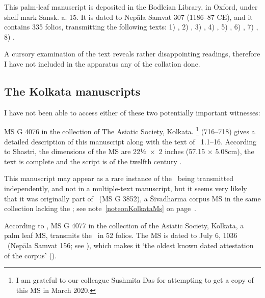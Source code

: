 This palm-leaf manuscript is deposited in the Bodleian Library, in Oxford, 
under shelf mark %
Sansk. a. 15. It is dated to Nepāla Samvat 307 (1186--87 CE),
and it contains 335 folios, transmitting the following texts: 
1) , %
2) , %
3) , %
4) , %
5) , %
6) , %
7) , %
8) . %

A cursory examination of the text reveals rather disappointing 
readings, therefore I have not included  in the apparatus
any of the collation done.

\medskip
\subsection{The Kolkata manuscripts}

I have not been able to access either of these two
potentially important witnesses:

MS G 4076 in the collection of The Asiatic Society, Kolkata.%
	\footnote{I am grateful to our colleague 
				     Sushmita Das for attempting to 
					get a copy of this MS in March 2020.}
 (716--718) gives a 
detailed description of this manuscript along with the text
of \VSS\ 1.1--16. According to Shastri, the dimensions of the MS are
22½~×~2 inches (57.15 × 5.08cm), the text is complete and
the script is of the twelfth century \CE. 

This manuscript may appear as a rare instance of the \VSS\
being transmitted independently, and not in a multiple-text
manuscript, but it seems very likely that it was originally part of
\msKob\ (MS G 3852), a Śivadharma corpus MS  in the same collection lacking the \VSS; see note~\ref{noteonKolkataMs}
on page~\pageref{noteonKolkataMs}.



According to ,
MS G 4077 in the collection of the Asiatic Society, Kolkata,
a palm leaf MS, transmits the \VSS\ in 52 folios.
The MS is dated to July 6, 1036 \CE\ (Nepāla Samvat 156; 
see ), which makes
it `the oldest known dated attestation of the corpus'
().


